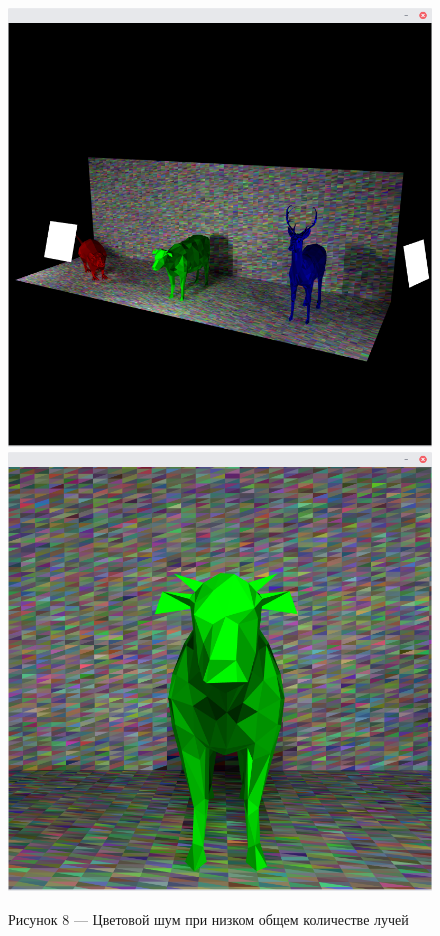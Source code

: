 \documentclass[12pt]{article}
\begin{document}
\begin{figure}[h]
\centering
\includegraphics[scale=0.3]{rgb_noise.png}
\includegraphics[scale=0.3]{rgb_noise2.png}
\caption*{Рисунок 8 --- Цветовой шум при низком общем количестве лучей}
\end{figure}
\end{document}
